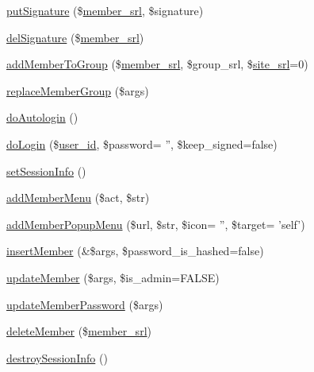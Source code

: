 \begin{DoxyCompactItemize}
\item 
\hyperlink{classmemberController_a084c3af4daea1a860f95e06f2bc5fc28}{put\-Signature} (\$\hyperlink{ko_8install_8php_aa61f9e08f0fe505094d26f8143f30bbd}{member\-\_\-srl}, \$signature)
\item 
\hyperlink{classmemberController_a0fa2ec662eb7a40333ca2049a103385e}{del\-Signature} (\$\hyperlink{ko_8install_8php_aa61f9e08f0fe505094d26f8143f30bbd}{member\-\_\-srl})
\item 
\hyperlink{classmemberController_aca7533f0e95df7227073436c24827c7b}{add\-Member\-To\-Group} (\$\hyperlink{ko_8install_8php_aa61f9e08f0fe505094d26f8143f30bbd}{member\-\_\-srl}, \$group\-\_\-srl, \$\hyperlink{ko_8install_8php_a8b1406b4ad1048041558dce6bfe89004}{site\-\_\-srl}=0)
\item 
\hyperlink{classmemberController_acc92443cdd02e55cec12099722482737}{replace\-Member\-Group} (\$args)
\item 
\hyperlink{classmemberController_aeb2590d01346c9a25c2b22f99429f6a3}{do\-Autologin} ()
\item 
\hyperlink{classmemberController_a92930ff9a5763ef9d6d292c7154269e4}{do\-Login} (\$\hyperlink{ko_8install_8php_a74f1a394389d774e5b4cd5d1d15413f7}{user\-\_\-id}, \$password= '', \$keep\-\_\-signed=false)
\item 
\hyperlink{classmemberController_ae4175b4a60e0b3000ed12e36508720ad}{set\-Session\-Info} ()
\item 
\hyperlink{classmemberController_aaa52725f8ba9ba16cfe4b350a51d7420}{add\-Member\-Menu} (\$act, \$str)
\item 
\hyperlink{classmemberController_a91303fbd27713d1990f88b8dd3c09b2b}{add\-Member\-Popup\-Menu} (\$url, \$str, \$icon= '', \$target= 'self')
\item 
\hyperlink{classmemberController_ae588324b8e86b9259e40d104b4d2b42d}{insert\-Member} (\&\$args, \$password\-\_\-is\-\_\-hashed=false)
\item 
\hyperlink{classmemberController_ac1ad3397eda0a695046b023a14d25496}{update\-Member} (\$args, \$is\-\_\-admin=F\-A\-L\-S\-E)
\item 
\hyperlink{classmemberController_aed05d2a367f7e7a5b70fcbd0b4a08e74}{update\-Member\-Password} (\$args)
\item 
\hyperlink{classmemberController_a5170b3fafc449f4cc6fc599c093fcc06}{delete\-Member} (\$\hyperlink{ko_8install_8php_aa61f9e08f0fe505094d26f8143f30bbd}{member\-\_\-srl})
\item 
\hyperlink{classmemberController_ac259eb5e2f5ea0b7e747608fa1a308bd}{destroy\-Session\-Info} ()

\end{DoxyCompactItemize}
